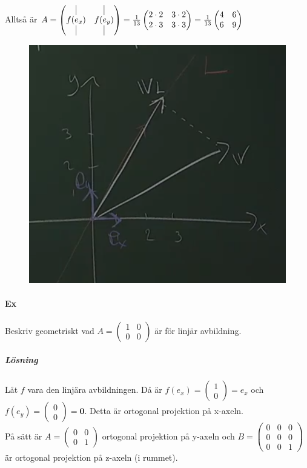 Alltså är $A=\begin{pmatrix}
    \vline&\vline\\
    f(e_{x})&f(e_{y})\\
    \vline&\vline
\end{pmatrix}=\frac{1}{13}\begin{pmatrix}
    2\cdot 2&3\cdot 2\\
    2\cdot 3&3\cdot 3
\end{pmatrix}=\frac{1}{13}\begin{pmatrix}4&6\\6&9\end{pmatrix}$
\begin{figure}[h]
    \includegraphics[scale=0.4]{imgs/img02.png}
\end{figure}

\paragraph{Ex} Beskriv geometriskt vad $A=\begin{pmatrix}1&0\\0&0\end{pmatrix}$ är för linjär avbildning.
\subparagraph{Lösning} Låt $f$ vara den linjära avbildningen.
Då är $f(e_{x})=\begin{pmatrix}1\\0\end{pmatrix}=e_{x}$ och $f(e_{y})=\begin{pmatrix}0\\0\end{pmatrix}=\bm{0}$.
Detta är ortogonal projektion på x-axeln.\\
På sätt är $A=\begin{pmatrix}0&0\\0&1\end{pmatrix}$ ortogonal projektion på y-axeln och 
$B=\begin{pmatrix}0&0&0\\0&0&0\\0&0&1\end{pmatrix}$ är ortogonal projektion på z-axeln (i rummet).

